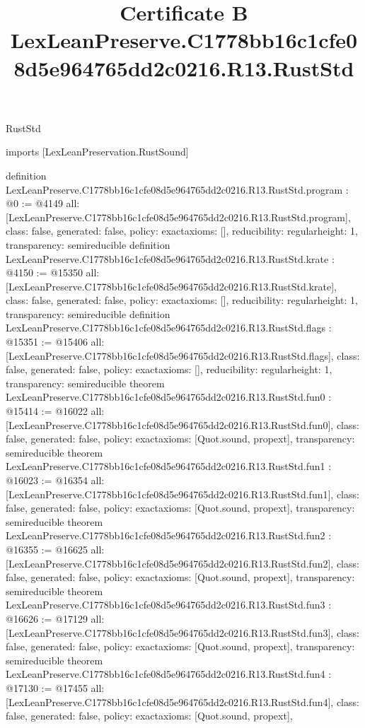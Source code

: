 \begin{lexlean}{RustStd}
\title{Certificate B LexLeanPreserve.C1778bb16c1cfe08d5e964765dd2c0216.R13.RustStd}
\begin{coremodule}
imports [LexLeanPreservation.RustSound]

definition LexLeanPreserve.C1778bb16c1cfe08d5e964765dd2c0216.R13.RustStd.program : @0 := @4149 {
  all: [LexLeanPreserve.C1778bb16c1cfe08d5e964765dd2c0216.R13.RustStd.program],
  class: false,
  generated: false,
  policy: exact{axioms: []},
  reducibility: regular{height: 1},
  transparency: semireducible
}
definition LexLeanPreserve.C1778bb16c1cfe08d5e964765dd2c0216.R13.RustStd.krate : @4150 := @15350 {
  all: [LexLeanPreserve.C1778bb16c1cfe08d5e964765dd2c0216.R13.RustStd.krate],
  class: false,
  generated: false,
  policy: exact{axioms: []},
  reducibility: regular{height: 1},
  transparency: semireducible
}
definition LexLeanPreserve.C1778bb16c1cfe08d5e964765dd2c0216.R13.RustStd.flags : @15351 := @15406 {
  all: [LexLeanPreserve.C1778bb16c1cfe08d5e964765dd2c0216.R13.RustStd.flags],
  class: false,
  generated: false,
  policy: exact{axioms: []},
  reducibility: regular{height: 1},
  transparency: semireducible
}
theorem LexLeanPreserve.C1778bb16c1cfe08d5e964765dd2c0216.R13.RustStd.fun0 : @15414 := @16022 {
  all: [LexLeanPreserve.C1778bb16c1cfe08d5e964765dd2c0216.R13.RustStd.fun0],
  class: false,
  generated: false,
  policy: exact{axioms: [Quot.sound, propext]},
  transparency: semireducible
}
theorem LexLeanPreserve.C1778bb16c1cfe08d5e964765dd2c0216.R13.RustStd.fun1 : @16023 := @16354 {
  all: [LexLeanPreserve.C1778bb16c1cfe08d5e964765dd2c0216.R13.RustStd.fun1],
  class: false,
  generated: false,
  policy: exact{axioms: [Quot.sound, propext]},
  transparency: semireducible
}
theorem LexLeanPreserve.C1778bb16c1cfe08d5e964765dd2c0216.R13.RustStd.fun2 : @16355 := @16625 {
  all: [LexLeanPreserve.C1778bb16c1cfe08d5e964765dd2c0216.R13.RustStd.fun2],
  class: false,
  generated: false,
  policy: exact{axioms: [Quot.sound, propext]},
  transparency: semireducible
}
theorem LexLeanPreserve.C1778bb16c1cfe08d5e964765dd2c0216.R13.RustStd.fun3 : @16626 := @17129 {
  all: [LexLeanPreserve.C1778bb16c1cfe08d5e964765dd2c0216.R13.RustStd.fun3],
  class: false,
  generated: false,
  policy: exact{axioms: [Quot.sound, propext]},
  transparency: semireducible
}
theorem LexLeanPreserve.C1778bb16c1cfe08d5e964765dd2c0216.R13.RustStd.fun4 : @17130 := @17455 {
  all: [LexLeanPreserve.C1778bb16c1cfe08d5e964765dd2c0216.R13.RustStd.fun4],
  class: false,
  generated: false,
  policy: exact{axioms: [Quot.sound, propext]},
}
\end{coremodule}
\end{lexlean}
